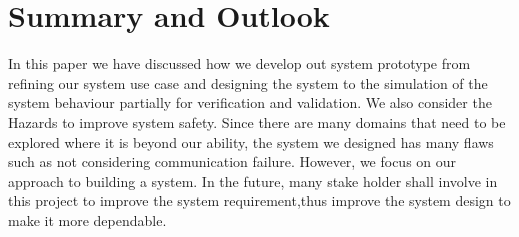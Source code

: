 \section{Summary and Outlook}
\label{sec:summary_and_outlook} 

In this paper we have discussed how we develop out system prototype from refining our system use case and  designing the system to the simulation of the system behaviour partially for verification and validation. We also consider the Hazards to improve system safety. Since there are many domains that need to be explored where it is beyond our ability, the system we designed has many flaws such as not considering communication failure. However, we focus on our approach to building a system. In the future, many stake holder shall involve in this project to improve the system requirement,thus improve the system design to make it more dependable.